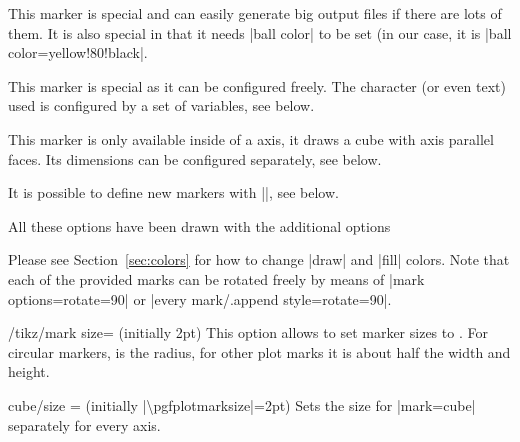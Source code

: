 \begin{longdescription}
    \item[mark=pentagon] 
    \item[mark=pentagon*] 
    \item[mark=ball] 

        This marker is special and can easily generate big output files if
        there are lots of them. It is also special in that it needs
        |ball color| to be set (in our case, it is |ball color=yellow!80!black|.

    \item[mark=text] 

        This marker is special as it can be configured freely. The character
        (or even text) used is configured by a set of variables, see below.

    \item[mark=cube] 

        This marker is only available inside of a \PGFPlots{} axis, it draws a
        cube with axis parallel faces. Its dimensions can be configured
        separately, see below.

    \item[mark=cube*] 
    \item[User defined] It is possible to define new markers with
        |\pgfdeclareplotmark|, see below.
\end{longdescription}
%
All these options have been drawn with the additional options
%
\begin{codeexample}
\draw [
    gray,
    thin,
    mark options={
        scale=2,fill=yellow!80!black,draw=black,
    },
]
\end{codeexample}
%
Please see Section~\ref{sec:colors} for how to change |draw| and |fill| colors.
Note that each of the provided marks can be rotated freely by means of
|mark options={rotate=90}| or |every mark/.append style={rotate=90}|.

\begin{key}{/tikz/mark size= (initially 2pt)}
    This \Tikz{} option allows to set marker sizes to . For
    circular markers,  is the radius, for other plot marks it
    is about half the width and height.
\end{key}

\begin{pgfplotsxykey}{cube/size \x= (initially |\textbackslash pgfplotmarksize|=2pt)}
    Sets the size for |mark=cube| separately for every axis.
\end{pgfplotsxykey}

